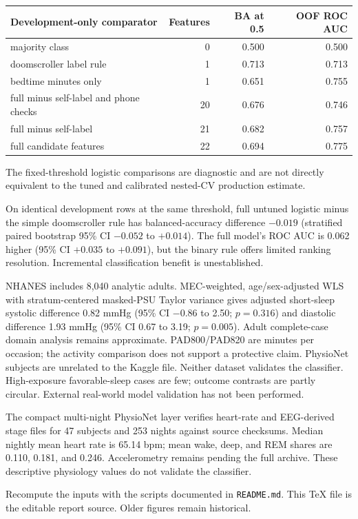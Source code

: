 \documentclass[10pt,a4paper]{article}
\newcommand{\reportsection}[1]{\needspace{5\baselineskip}\vspace{9pt}{\large\bfseries\color{accent}#1}\par\vspace{3pt}}
\begin{document}
\begin{tabularx}{\linewidth}{Xrrr}
\toprule Development-only comparator & Features & BA at 0.5 & OOF ROC AUC \\
\midrule
majority class & 0 & 0.500 & 0.500 \\
doomscroller label rule & 1 & 0.713 & 0.713 \\
bedtime minutes only & 1 & 0.651 & 0.755 \\
full minus self-label and phone checks & 20 & 0.676 & 0.746 \\
full minus self-label & 21 & 0.682 & 0.757 \\
full candidate features & 22 & 0.694 & 0.775 \\
\bottomrule
\end{tabularx}

The fixed-threshold logistic comparisons are diagnostic and are not directly equivalent to the tuned and calibrated nested-CV production estimate.

On identical development rows at the same threshold, full untuned logistic minus the simple doomscroller rule has balanced-accuracy difference $-0.019$ (stratified paired bootstrap 95\% CI $-0.052$ to $+0.014$). The full model's ROC AUC is 0.062 higher (95\% CI $+0.035$ to $+0.091$), but the binary rule offers limited ranking resolution. Incremental classification benefit is unestablished.

\reportsection{Independent context and limitations}
NHANES includes 8,040 analytic adults. MEC-weighted, age/sex-adjusted WLS with stratum-centered masked-PSU Taylor variance gives adjusted short-sleep systolic difference 0.82 mmHg (95\% CI $-0.86$ to 2.50; $p=0.316$) and diastolic difference 1.93 mmHg (95\% CI 0.67 to 3.19; $p=0.005$). Adult complete-case domain analysis remains approximate. PAD800/PAD820 are minutes per occasion; the activity comparison does not support a protective claim. PhysioNet subjects are unrelated to the Kaggle file. Neither dataset validates the classifier. High-exposure favorable-sleep cases are few; outcome contrasts are partly circular. External real-world model validation has not been performed.

The compact multi-night PhysioNet layer verifies heart-rate and EEG-derived stage files for 47 subjects and 253 nights against source checksums. Median nightly mean heart rate is 65.14 bpm; mean wake, deep, and REM shares are 0.110, 0.181, and 0.246. Accelerometry remains pending the full archive. These descriptive physiology values do not validate the classifier.

\vfill\small
Recompute the inputs with the scripts documented in \texttt{README.md}. This TeX file is the editable report source. Older figures remain historical.
\end{document}
